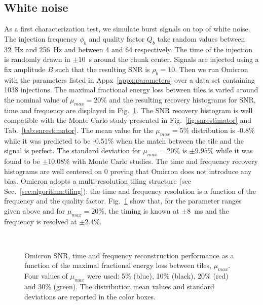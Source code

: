 \subsection{White noise} \label{sec:characterization:white}
As a first characterization test, we simulate burst signals on top of white noise. The injection frequency $\phi_b$ and quality factor $Q_b$ take random values between 32~Hz and 256~Hz and between 4 and 64 respectively. The time of the injection is randomly drawn in $\pm10$~s around the chunk center. Signals are injected using a fix amplitude $B$ such that the resulting SNR is $\rho_b=10$. Then we run Omicron with the parameters listed in Appx~\ref{appx:parameters} over a data set containing 1038 injections. The maximal fractional energy loss between tiles is varied around the nominal value of $\mu_{max}=20\%$ and the resulting recovery histograms for SNR, time and frequency are displayed in Fig.~\ref{fig:char_mismatch}. The SNR recovery histogram is well compatible with the Monte Carlo study presented in Fig.~\ref{fig:snrestimator} and Tab.~\ref{tab:snrestimator}. The mean value for the $\mu_{max}=5\%$ distribution is -0.8\% while it was predicted to be -0.51\% when the match between the tile and the signal is perfect. The standard deviation for $\mu_{max}=20\%$ is $\pm9.95\%$ while it was found to be $\pm10.08\%$ with Monte Carlo studies. The time and frequency recovery histograms are well centered on 0 proving that Omicron does not introduce any bias. Omicron adopts a multi-resolution tiling structure (see Sec.~\ref{sec:algorithm:tiling}): the time and frequency resolution is a function of the frequency and the quality factor. Fig.~\ref{fig:char_mismatch} show that, for the parameter ranges given above and for $\mu_{max}=20\%$, the timing is known at $\pm8$~ms and the frequency is resolved at $\pm2.4\%$. 
\begin{figure}
  \center
   \\
  \caption{Omicron SNR, time and frequency reconstruction performance as a function of the maximal fractional energy loss between tiles, $\mu_{max}$. Four values of $\mu_{max}$ were used: 5\% (blue), 10\% (black), 20\% (red) and 30\% (green). The distribution mean values and standard deviations are reported in the color boxes.}
  \label{fig:char_mismatch}
\end{figure}

